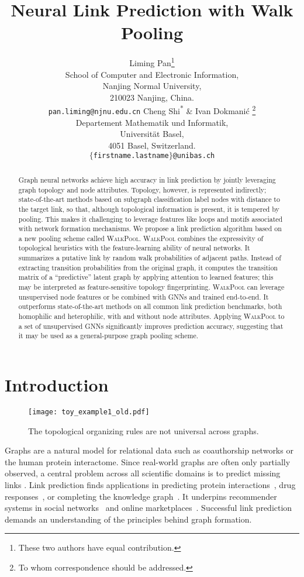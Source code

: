 \documentclass[11pt]{article}
\title{Neural Link Prediction with Walk Pooling}
\author{Liming Pan\thanks{These two authors have equal contribution.} \\
School of Computer and Electronic Information,\\
Nanjing Normal University,\\
210023 Nanjing, China. \\
\texttt{pan.liming@njnu.edu.cn}
\And
Cheng Shi\textsuperscript{*} \& Ivan Dokmanić \thanks{To whom correspondence should be addressed.}\\
Departement Mathematik und Informatik,\\
Universität Basel,\\
4051 Basel, Switzerland. \\
\texttt{$\{$firstname.lastname$\}$@unibas.ch}
}
\newcommand{\walkpool}{\textsc{WalkPool}\xspace}
\newcommand{\UPDATE}[1]{\textcolor{WowColor}{{#1}}}
\newcounter{margincounter}
\newcommand{\displaycounter}{{\arabic{margincounter}}}
\newcommand{\incdisplaycounter}{{\stepcounter{margincounter}\arabic{margincounter}}}
\newcommand{\fTBD}[1]{\textcolor{SubtleColor}{$\,^{(\incdisplaycounter)}$}\marginnote{\tiny\textcolor{SubtleColor}{ {\tiny $(\displaycounter)$} #1}}}
\renewcommand{\fTBD}[1]{}
\renewcommand{\UPDATE}[1]{#1}
\begin{document}
\maketitle
\vspace{-4mm}
\begin{abstract}
    \vspace{-2mm}
    Graph neural networks achieve high accuracy in link prediction by jointly leveraging  graph topology and node attributes. Topology, however, is represented indirectly; state-of-the-art methods based on subgraph classification label nodes with distance to the target link, so that, although topological information is present, it is tempered by pooling. This makes it challenging to leverage features like loops and motifs associated with network formation mechanisms.\fTBD{Reminder for later: Pooling is not the only issue: even without it it would be hard (impossible?) to count loops etc from node distance labels.} We propose a link prediction algorithm based on a new pooling scheme called \walkpool. \walkpool combines the expressivity of topological heuristics with the feature-learning ability of neural networks. It summarizes a putative link by random walk probabilities of adjacent paths. Instead of extracting transition probabilities from the original graph, it computes the transition matrix of a ``predictive'' latent graph by applying attention to learned features; this may be interpreted as feature-sensitive topology fingerprinting. \walkpool can leverage unsupervised node features or be combined with GNNs and trained end-to-end. It outperforms state-of-the-art methods on all common link prediction benchmarks, both homophilic and heterophilic, with and without node attributes. Applying \walkpool to a set of unsupervised GNNs significantly improves prediction accuracy, suggesting that it may be used as a general-purpose graph pooling scheme.    
\end{abstract}
\vspace{-4mm}
\section{Introduction}
\begin{wrapfigure}{l}{0.44\textwidth} 
\centering
\texttt{[image: toy\_example1\_old.pdf]}
\caption{\UPDATE{The topological organizing rules are not universal across graphs.}}
\label{fig:learnwp}
\vspace{-2mm}
\end{wrapfigure}
Graphs are a natural model for relational data such as coauthorship networks or the human protein interactome. Since real-world graphs are often only partially observed, a central problem across all scientific domains is to predict missing links \citep{liben2007link}. Link prediction finds applications in predicting protein interactions~\citep{qi2006evaluation}, drug responses~\citep{stanfield2017drug}, or completing the knowledge graph~\citep{nickel2015review}. It underpins recommender systems in social networks~\citep{adamic2003friends} and online marketplaces~\citep{lu2012recommender}. 
Successful link prediction demands an understanding of the principles behind graph formation.
\end{document}
